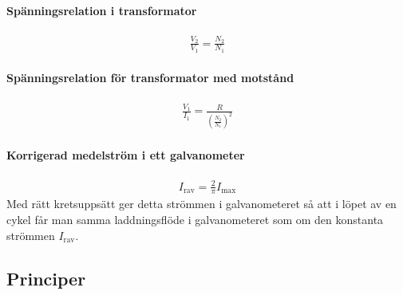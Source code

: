 \deriv

\paragraph{Spänningsrelation i transformator}
\begin{align*}
	\frac{V_2}{V_1} = \frac{N_2}{N_1}
\end{align*}

\paragraph{Spänningsrelation för transformator med motstånd}
\begin{align*}
	\frac{V_1}{I_1} = \frac{R}{\left(\frac{N_2}{N_1}\right)^2}
\end{align*}

\paragraph{Korrigerad medelström i ett galvanometer}
\begin{align*}
	I_{\text{rav}} = \frac{2}{\pi}I_{\text{max}}
\end{align*}
Med rätt kretsuppsätt ger detta strömmen i galvanometeret så att i löpet av en cykel får man samma laddningsflöde i galvanometeret som om den konstanta strömmen $I_{\text{rav}}$.

\subsection{Principer}